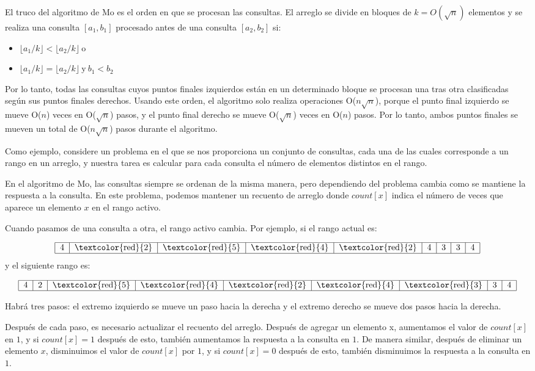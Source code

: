 El truco del algoritmo de Mo es el orden en que se procesan las consultas. El arreglo se divide en bloques de $k = O(\sqrt{n})$ elementos y se realiza una consulta $[a_1 ,b_1]$
procesado antes de una consulta $[a_2 , b_2]$ si:

\begin{itemize}
	\item $\lfloor a_1/k \rfloor < \lfloor a_2/k \rfloor ~\text{o}$
	\item $\lfloor a_1/k \rfloor = \lfloor a_2/k \rfloor ~\text{y} ~ b_1 < b_2$
\end{itemize}

Por lo tanto, todas las consultas cuyos puntos finales izquierdos están en un determinado bloque se procesan una tras otra clasificadas según sus puntos finales derechos. Usando este orden, el algoritmo solo realiza operaciones O($n\sqrt{n}$), porque el punto final izquierdo se mueve O($n$) veces en O($\sqrt{n}$) pasos, y el punto final derecho se mueve O($\sqrt{n}$) veces  en O($n$) pasos. Por lo tanto, ambos puntos finales se mueven un total de O($n\sqrt{n}$) pasos durante el algoritmo.

Como ejemplo, considere un problema en el que se nos proporciona un conjunto de consultas, cada una de las cuales corresponde a un rango en un arreglo, y nuestra tarea es calcular para cada consulta el número de elementos distintos en el rango.

En el algoritmo de Mo, las consultas siempre se ordenan de la misma manera, pero dependiendo del problema cambia como se mantiene la respuesta a la consulta. En este problema, podemos mantener un recuento de arreglo donde $count[x]$ indica el número de veces que aparece un elemento $x$ en el rango activo.

Cuando pasamos de una consulta a otra, el rango activo cambia. Por ejemplo, si el rango actual es:

$$
\begin{tabular}{|c|c|c|c|c|c|c|c|c|}
	\hline
4 & \textcolor{red}{2}  & \textcolor{red}{5} & \textcolor{red}{4} & \textcolor{red}{2} & 4 & 3 & 3 & 4 \\
	\hline 
\end{tabular}
$$
y el siguiente rango es:

$$\begin{tabular}{|c|c|c|c|c|c|c|c|c|}
	\hline
	4 & 2 & \textcolor{red}{5} & \textcolor{red}{4} & \textcolor{red}{2} & \textcolor{red}{4} & \textcolor{red}{3} & 3 & 4 \\
	\hline 
\end{tabular}$$


Habrá tres pasos: el extremo izquierdo se mueve un paso hacia la derecha y el extremo derecho se mueve dos pasos hacia la derecha.

Después de cada paso, es necesario actualizar el recuento del arreglo. Después de agregar un elemento x, aumentamos el valor de $count[x]$ en $1$, y si $count[x]=1$ después de esto, también aumentamos la respuesta a la consulta en $1$. De manera similar, después de eliminar un elemento $x$, disminuimos el valor de $count[x]$ por $1$, y si $count[x]=0$ después de esto, también disminuimos la respuesta a la consulta en $1$.

